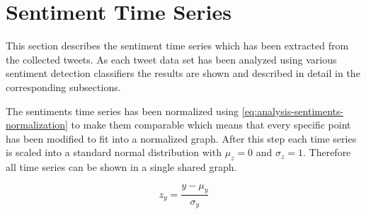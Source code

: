 
\section{Sentiment Time Series}
\label{s:analysis-sentiments}

This section describes the sentiment time series which has been extracted from the collected tweets.
As each tweet data set has been analyzed using various sentiment detection classifiers the results are shown and described in detail in the corresponding subsections.

The sentiments time series has been normalized using \cref{eq:analysis-sentiments-normalization} to make them comparable which means that every specific point has been modified to fit into a normalized graph.
After this step each time series is scaled into a standard normal distribution with $\mu_z = 0$ and $\sigma_z = 1$.
Therefore all time series can be shown in a single shared graph.

\begin{equation}
    z_y = \frac{y - \mu_y}{\sigma_y}
    \label{eq:analysis-sentiments-normalization}
\end{equation}

